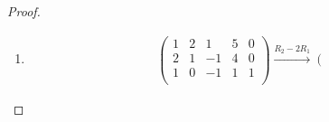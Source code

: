 \documentclass[prb,12pt]{revtex4-2}
\theoremstyle{definition}
\theoremstyle{definition}
\newenvironment{parts}{\begin{enumerate}[label=(\alph*)]}{\end{enumerate}}
\begin{document}
\begin{proof}
\begin{parts}
\begin{gather*}
\begin{array}{cccc|c}
 1 & 2 & 1 & 5 & -38 \\
 0 & 1 & 1 & 2 & -10 \\
 0 & 0 & 0 & 0 & 0 \\
\end{array}
\right)\\ \xrightarrow{R_1-2R_2} \left(
\begin{array}{cccc|c}
 1 & 0 & -1 & 1 & -18 \\
 0 & 1 & 1 & 2 & -10 \\
 0 & 0 & 0 & 0 & 0 \\
\end{array}
\right)
	\end{gather*}
	\begin{align*}
		x_1-x_3+x_4=&-18\\
		x_2+x_3+2x_4=&-10
	\end{align*}	
	Deswegen ist $\text{L\"{o}s}(A,b)$ 
	\begin{align*}
		\begin{pmatrix} -18+x_3-x_4\\-10-x_3-2x_4 \\ x_3 \\ x_4 \end{pmatrix} =& \begin{pmatrix} -18 \\ -10 \\ 0 \\ 0 \end{pmatrix} +x_3\begin{pmatrix} 1 \\ -1 \\ 1 \\ 0 \end{pmatrix} +x_4 \begin{pmatrix} -1 \\ -2 \\ 0 \\ 1 \end{pmatrix} 
	\end{align*}
\item 
	\begin{align*}
\left(
\begin{array}{cccc|c}
 1 & 2 & 1 & 5 & 0 \\
 2 & 1 & -1 & 4 & 0 \\
 1 & 0 & -1 & 1 & 1 \\
\end{array}
\right) \xrightarrow{R_2-2R_1} \left(
\begin{array}{cccc|c}

\end{array}
\end{align*}
\end{parts}
\end{proof}
\end{document}
